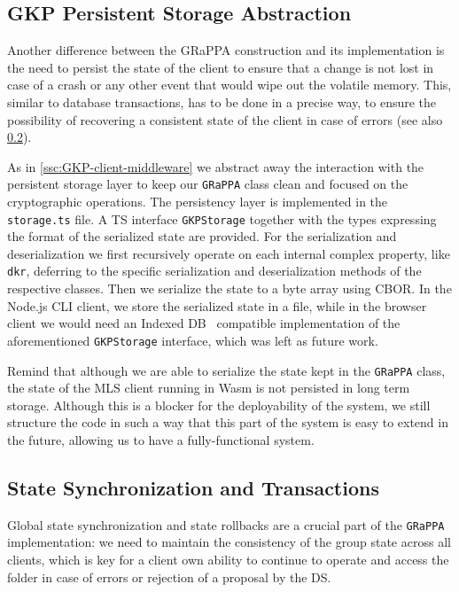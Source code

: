 \subsection{GKP Persistent Storage Abstraction}\label{ssc:GKP-persistent-storage}
Another difference between the GRaPPA construction and its implementation
is the need to persist the state of the client
to ensure that a change is not lost in case of a crash
or any other event that would wipe out the volatile memory.
This, similar to database transactions, has to be done
in a precise way, to ensure the possibility of recovering a
consistent state of the client in case of errors (see also \cref{sc:state-sync-rollbacks}). 

As in \cref{ssc:GKP-client-middleware} we abstract away the interaction
with the persistent storage layer to keep our
\texttt{GRaPPA} class clean and focused on the cryptographic operations.
The persistency layer is implemented in the \texttt{storage.ts} file.
A TS interface \texttt{GKPStorage} together with the types expressing
the format of the serialized state are provided. 
For the serialization and
deserialization we first recursively operate on each
internal complex property, like \texttt{dkr}, deferring to
the specific serialization and deserialization methods of the
respective classes. Then we serialize the state to a byte array
using CBOR. In the Node.js CLI client, we store
the serialized state in a file, while in the browser client
we would need an Indexed DB~\cite{IndexedDBAPI} compatible implementation of the
aforementioned \texttt{GKPStorage} interface, which was left
as future work.

Remind that although we are able to serialize
the state kept in the \texttt{GRaPPA} class,
the state of the MLS client running in Wasm is not persisted
in long term storage.
Although this is a blocker for the deployability of the system,
we still structure the code in such a way that this part of
the system is easy to extend in the future, allowing us to
have a fully-functional system.

\subsection{State Synchronization and Transactions}\label{sc:state-sync-rollbacks}

Global state synchronization and state rollbacks are a crucial part of the \texttt{GRaPPA} implementation:
we need to maintain the consistency of the group state across all clients, which is 
key for a client own ability to continue to operate and access the folder in case of
errors or rejection of a proposal by the DS.

